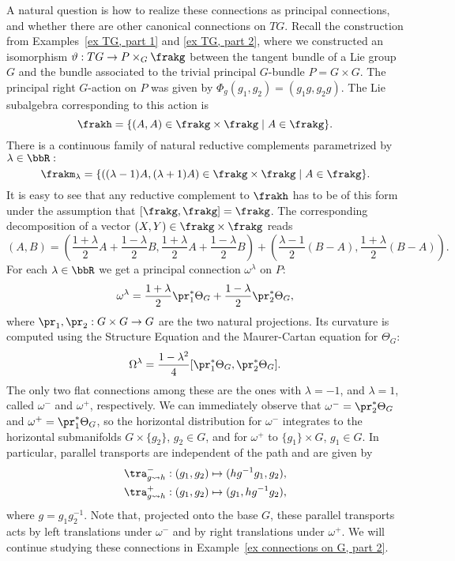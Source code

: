 \begin{example}
    A natural question is how to realize these connections as principal connections, and whether there are other canonical connections on $TG$. Recall the construction from Examples~\ref{ex TG, part 1} and \ref{ex TG, part 2}, where we constructed an isomorphism $\vartheta:TG\to P\times_G \frakg$ between the tangent bundle of a Lie group $G$ and the bundle associated to the trivial principal $G$-bundle $P=G\times G$. The principal right $G$-action on $P$ was given by $\Phi_g(g_1,g_2)=(g_1g,g_2g)$. The Lie subalgebra corresponding to this action is
    \[\frakh=\{(A,A)\in \frakg\times\frakg\mid A\in\frakg\}.\]
    There is a continuous family of natural reductive complements parametrized by $\lambda\in\bbR:$
    \[\frakm_\lambda=\{((\lambda-1)A,(\lambda+1)A)\in \frakg\times\frakg\mid A\in\frakg\}.\] 
    It is easy to see that any reductive complement to $\frakh$ has to be of this form under the assumption that $[\frakg,\frakg]=\frakg$. The corresponding decomposition of a vector $(X,Y)\in\frakg\times\frakg$ reads
    \[(A,B)=\left(\frac{1+\lambda}{2}A+\frac{1-\lambda}{2}B,\frac{1+\lambda}{2}A+\frac{1-\lambda}{2}B\right)+\left(\frac{\lambda-1}{2}(B-A),\frac{1+\lambda}{2}(B-A)\right).\]
    For each $\lambda\in\bbR$ we get a principal connection $\omega^\lambda$ on $P$:
    \[\omega^\lambda=\frac{1+\lambda}{2}\pr_1^\ast \Theta_G+\frac{1-\lambda}{2}\pr_2^\ast \Theta_G,\]
    where $\pr_1,\pr_2:G\times G\to G$ are the two natural projections. Its curvature is computed using the Structure Equation and the Maurer-Cartan equation for $\Theta_G$:
    \[\Omega^\lambda=\frac{1-\lambda^2}{4}[\pr_1^\ast \Theta_G,\pr_2^\ast\Theta_G].\]
    The only two flat connections among these are the ones with $\lambda=-1$, and $\lambda=1$, called $\omega^-$ and $\omega^+$, respectively. We can immediately observe that $\omega^-=\pr_2^\ast\Theta_G$ and $\omega^+=\pr_1^\ast\Theta_G$, so the horizontal distribution for $\omega^-$ integrates to the horizontal submanifolds $G\times\{g_2\}$, $g_2\in G$, and for $\omega^+$ to $\{g_1\}\times G$, $g_1\in G$. In particular, parallel transports are independent of the path and are given by
    \begin{align}
        \tra^-_{g\leadsto h}: (g_1,g_2)\mapsto (hg^{-1}g_1,g_2),\\
        \tra^+_{g\leadsto h}: (g_1,g_2)\mapsto (g_1,hg^{-1}g_2),
    \end{align}
    where $g=g_1g_2^{-1}$. Note that, projected onto the base $G$, these parallel transports acts by left translations under $\omega^-$ and by right translations under $\omega^+$.
    We will continue studying these connections in Example~\ref{ex connections on G, part 2}.
\end{example}









